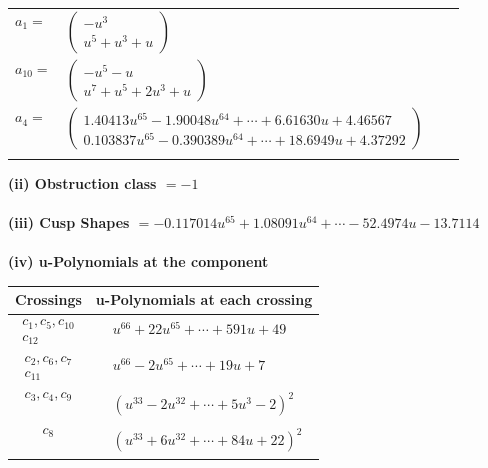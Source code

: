 \documentclass[1p]{elsarticle_modified}
\theoremstyle{definition}
\begin{document}
\begin{tabular}{m{7pt} m{180pt} m{7pt} m{180pt} }
\flushright $a_{1}=$&$\begin{pmatrix}- u^3\\u^5+u^3+u\end{pmatrix}$ \\
\flushright $a_{10}=$&$\begin{pmatrix}- u^5- u\\u^7+u^5+2 u^3+u\end{pmatrix}$ \\
\flushright $a_{4}=$&$\begin{pmatrix}1.40413 u^{65}-1.90048 u^{64}+\cdots+6.61630 u+4.46567\\0.103837 u^{65}-0.390389 u^{64}+\cdots+18.6949 u+4.37292\end{pmatrix}$\\&\end{tabular}
\flushleft \textbf{(ii) Obstruction class $= -1$}\\~\\
\flushleft \textbf{(iii) Cusp Shapes $= -0.117014 u^{65}+1.08091 u^{64}+\cdots-52.4974 u-13.7114$}\\~\\
\newpage\renewcommand{\arraystretch}{1}
\flushleft \textbf{(iv) u-Polynomials at the component}\newline \\
\begin{tabular}{m{50pt}|m{274pt}}
Crossings & \hspace{64pt}u-Polynomials at each crossing \\
\hline $$\begin{aligned}c_{1},c_{5},c_{10}\\c_{12}\end{aligned}$$&$\begin{aligned}
&u^{66}+22 u^{65}+\cdots+591 u+49
\end{aligned}$\\
\hline $$\begin{aligned}c_{2},c_{6},c_{7}\\c_{11}\end{aligned}$$&$\begin{aligned}
&u^{66}-2 u^{65}+\cdots+19 u+7
\end{aligned}$\\
\hline $$\begin{aligned}c_{3},c_{4},c_{9}\end{aligned}$$&$\begin{aligned}
&(u^{33}-2 u^{32}+\cdots+5 u^3-2)^{2}
\end{aligned}$\\
\hline $$\begin{aligned}c_{8}\end{aligned}$$&$\begin{aligned}
&(u^{33}+6 u^{32}+\cdots+84 u+22)^{2}
\end{aligned}$\\
\hline
\end{tabular}\\~\\
\end{document}
